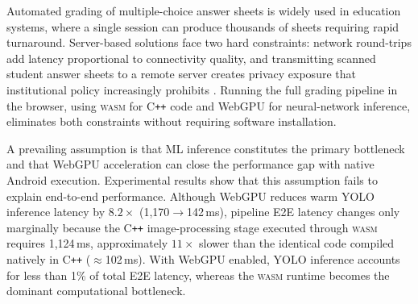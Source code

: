 \documentclass[conference]{IEEEtran}
\newcommand{\wasm}{\textsc{wasm}}
\newcommand{\ms}{\,ms}
\begin{document}

Automated grading of multiple-choice answer sheets is widely used in education systems, where a single session can produce thousands of sheets requiring rapid turnaround. Server-based solutions face two hard constraints: network round-trips add latency proportional to connectivity quality, and transmitting scanned student answer sheets to a remote server creates privacy exposure that institutional policy increasingly prohibits \cite{patel2015,okorie2022}. Running the full grading pipeline in the browser, using \wasm{} for C\texttt{++} code and WebGPU for neural-network inference, eliminates both constraints without requiring software installation. 

A prevailing assumption is that ML inference constitutes the primary bottleneck and that WebGPU acceleration can close the performance gap with native Android execution. Experimental results show that this assumption fails to explain end-to-end performance. Although WebGPU reduces warm YOLO inference latency by $8.2\times$ (1{,}170$\to$142\ms{}), pipeline E2E latency changes only marginally because the C\texttt{++} image-processing stage executed through \wasm{} requires 1{,}124\ms{}, approximately $11\times$ slower than the identical code compiled natively in C\texttt{++} ($\approx$102\ms{}). With WebGPU enabled, YOLO inference accounts for less than 1\% of total E2E latency, whereas the \wasm{} runtime becomes the dominant computational bottleneck. 
\end{document}
